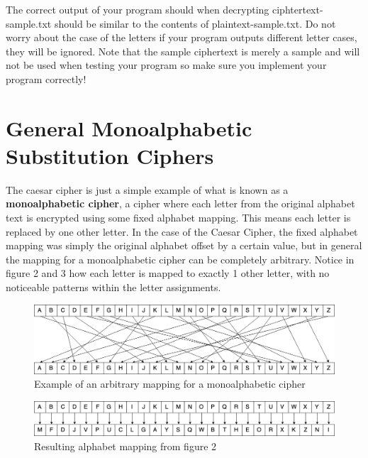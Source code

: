 \documentclass{article}
\begin{document}
\begin{info}[Correctness:] %
The correct output of your program should when decrypting ciphtertext-sample.txt should be similar to the contents of  plaintext-sample.txt. Do not worry about the case of the letters if your program outputs different letter cases, they will be ignored. Note that the sample ciphertext is merely a sample and will not be used when testing your program so make sure you implement your program correctly!
\end{info}



\section{General Monoalphabetic Substitution Ciphers}
The caesar cipher is just a simple example of what is known as a \textbf{monoalphabetic cipher}, a cipher where each letter from the original alphabet text is encrypted using some fixed alphabet mapping. This means each letter is replaced by one other letter. In the case of the Caesar Cipher, the fixed alphabet mapping was simply the original alphabet offset by a certain value, but in general the mapping for a monoalphabetic cipher can be completely arbitrary. Notice in figure 2 and 3 how each letter is mapped to exactly 1 other letter, with no noticeable patterns within the letter assignments.\\

\begin{figure}[h!]
 \centering
  \includegraphics[width=1\textwidth]{monocipher1}
 \caption{Example of an arbitrary mapping for a monoalphabetic cipher}
 \end{figure}


 \begin{figure}[h!]
 \centering
  \includegraphics[width=1\textwidth]{monocipher2}
 \caption{Resulting alphabet mapping from figure 2}
 \end{figure}
\end{document}
